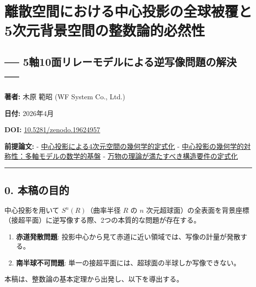 \documentclass[a4paper,11pt]{ltjsarticle}
\providecommand{\tightlist}{\setlength{\itemsep}{0pt}\setlength{\parskip}{0pt}}
\begin{document}
\section{離散空間における中心投影の全球被覆と5次元背景空間の整数論的必然性}\label{ux96e2ux6563ux7a7aux9593ux306bux304aux3051ux308bux4e2dux5fc3ux6295ux5f71ux306eux5168ux7403ux88abux8986ux30685ux6b21ux5143ux80ccux666fux7a7aux9593ux306eux6574ux6570ux8ad6ux7684ux5fc5ux7136ux6027}

\subsection{── 5軸10面リレーモデルによる逆写像問題の解決
──}\label{ux8ef810ux9762ux30eaux30ecux30fcux30e2ux30c7ux30ebux306bux3088ux308bux9006ux5199ux50cfux554fux984cux306eux89e3ux6c7a}

\textbf{著者:} 木原 範昭 (WF System Co., Ltd.)

\textbf{日付:} 2026年4月

\textbf{DOI:}
\href{https://doi.org/10.5281/zenodo.19624957}{10.5281/zenodo.19624957}

\textbf{前提論文:} -
\href{https://doi.org/10.5281/zenodo.19427780}{中心投影による4次元空間の幾何学的定式化}
-
\href{https://doi.org/10.5281/zenodo.19434932}{中心投影の幾何学的対称性：多軸モデルの数学的基盤}
-
\href{https://doi.org/10.5281/zenodo.19601592}{万物の理論が満たすべき構造要件の定式化}

\begin{center}\rule{0.5\linewidth}{0.5pt}\end{center}

\subsection{0. 本稿の目的}\label{ux672cux7a3fux306eux76eeux7684}

中心投影を用いて \(S^n(R)\)（曲率半径 \(R\) の \(n\)
次元超球面）の全表面を背景座標（接超平面）に逆写像する際、2つの本質的な問題が存在する。

\begin{enumerate}
\def\labelenumi{\arabic{enumi}.}
\tightlist
\item
  \textbf{赤道発散問題}:
  投影中心から見て赤道に近い領域では、写像の計量が発散する。
\item
  \textbf{南半球不可問題}:
  単一の接超平面には、超球面の半球しか写像できない。
\end{enumerate}

本稿は、整数論の基本定理から出発し、以下を導出する。
\end{document}
